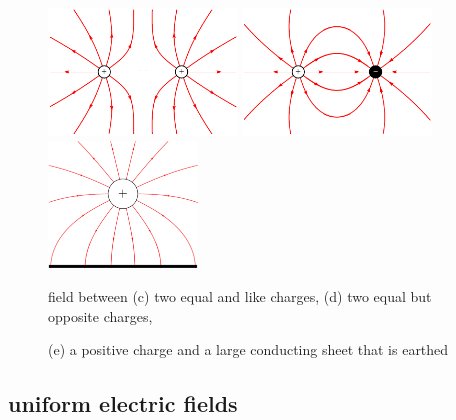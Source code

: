 \begin{figure}[htp]
	\vspace*{-18pt}
	\begin{minipage}{0.3\linewidth}
		\centering
		\includegraphics[height=96pt]{like-charges}
	\end{minipage}\hfill
	\begin{minipage}{0.3\linewidth}
		\centering
		\includegraphics[height=96pt]{opposite-charges}
	\end{minipage}\hfill
	\begin{minipage}{0.3\linewidth}
		\centering
		\includegraphics[height=96pt]{sheet-charge}
	\end{minipage}
	
	\begin{center}
		field between (c) two equal and like charges, (d) two equal but opposite charges,
		
		(e) a positive charge and a large conducting sheet that is earthed
	\end{center}
	
	
\end{figure}


\subsection{uniform electric fields}

